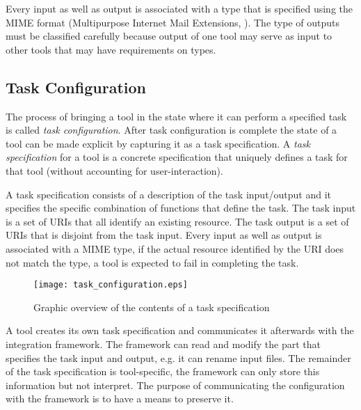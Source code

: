 \documentclass{article}
\begin{document}
   Every input as well as output is associated with a type that is specified
   using the MIME format (Multipurpose Internet Mail Extensions, \cite{rfc2822}).
   The type of outputs must be classified carefully because output of one tool
   may serve as input to other tools that may have requirements on types.

  \subsection{Task Configuration} \label{concepts::task_configuration}

   
   The process of bringing a tool in the state where it can perform a specified
   task is called \textit{task configuration}. After task configuration is
   complete the state of a tool can be made explicit by capturing it as a task
   specification.  A \textit{task specification} for a tool is a concrete
   specification that uniquely defines a task for that tool (without accounting
   for user-interaction).

   \noindent A task specification consists of a description of the task
   input/output and it specifies the specific combination of functions that
   define the task. The task input is a set of URIs that all identify an
   existing resource. The task output is a set of URIs that is disjoint from
   the task input. Every input as well as output is associated with a MIME
   type, if the actual resource identified by the URI does not match the type, a
   tool is expected to fail in completing the task.

   \begin{figure}[H]
    \begin{center}
     \texttt{[image: task\_configuration.eps]}
    \end{center}
    \caption{Graphic overview of the contents of a task specification}
   \end{figure}

 
   A tool creates its own task specification and communicates it afterwards
   with the integration framework. The framework can read and modify the part
   that specifies the task input and output, e.g. it can rename input files.
   The remainder of the task specification is tool-specific, the framework can
   only store this information but not interpret. The purpose of communicating
   the configuration with the framework is to have a means to preserve it.
   
\end{document}
